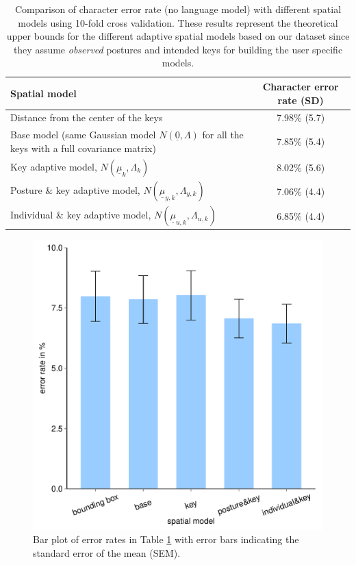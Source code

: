 \documentclass{sigchi}
\newcommand\tabhead[1]{\small\textbf{#1}}
\begin{document}
\begin{table} [tb]
  \centering
  \begin{tabular}{|l|c|}
    \hline
    \tabhead{Spatial model} &
    \multicolumn{1}{|p{0.2\columnwidth}|}{\centering\tabhead{Character
    error rate (SD)}} \\
    \hline
    Distance from the center of the keys & 7.98\% (5.7) \\
    \hline
    \multicolumn{1}{|p{0.7\columnwidth}|}{Base model (same Gaussian model $N(\underline 0, \Lambda)$ for
    all the keys with a full covariance matrix)} & 7.85\% (5.4) \\
    \hline
    \multicolumn{1}{|p{0.7\columnwidth}|}{Key adaptive model, $N(\underline
    \mu_k, \Lambda_k)$} & 8.02\% (5.6) \\
    \hline
    \multicolumn{1}{|p{0.7\columnwidth}|}{Posture \& key adaptive model,
    $N(\underline \mu_{y,k}, \Lambda_{y,k})$} & 7.06\% (4.4) \\
    \hline
     \multicolumn{1}{|p{0.7\columnwidth}|}{Individual \& key adaptive model,
     $N(\underline \mu_{u,k}, \Lambda_{u,k})$} & 6.85\% (4.4) \\
    \hline
  \end{tabular}
  \caption{Comparison of character error rate (no language model) with
  different spatial models using 10-fold cross validation. These results represent the theoretical upper bounds for the different adaptive spatial models based on our dataset since they assume \textit{observed} postures and intended keys for building the user specific models.}
  \label{tab:comparison}
\end{table}

\begin{figure}[tb]
  \centering
  \includegraphics[width=0.8\columnwidth,
  height=0.6\columnwidth]{figures/error-rates.pdf}
  \caption{Bar plot of error rates in Table \ref{tab:comparison} with error bars
  indicating the standard error of the mean (SEM).}
  \label{fig:error-bar1}
\end{figure}
\end{document}
